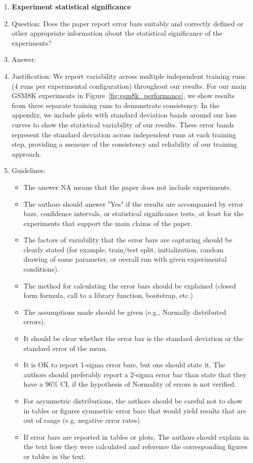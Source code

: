 \documentclass{article}
\begin{document}
\begin{enumerate}
\item {\bf Experiment statistical significance}
    \item[] Question: Does the paper report error bars suitably and correctly defined or other appropriate information about the statistical significance of the experiments?
    \item[] Answer: \answerYes{} %
    \item[] Justification: We report variability across multiple independent training runs (4 runs per experimental configuration) throughout our results. For our main GSM8K experiments in Figure~\ref{fig:gsm8k_performance}, we show results from three separate training runs to demonstrate consistency. In the appendix, we include plots with standard deviation bands around our loss curves to show the statistical variability of our results. These error bands represent the standard deviation across independent runs at each training step, providing a measure of the consistency and reliability of our training approach.
    \item[] Guidelines:
    \begin{itemize}
        \item The answer NA means that the paper does not include experiments.
        \item The authors should answer "Yes" if the results are accompanied by error bars, confidence intervals, or statistical significance tests, at least for the experiments that support the main claims of the paper.
        \item The factors of variability that the error bars are capturing should be clearly stated (for example, train/test split, initialization, random drawing of some parameter, or overall run with given experimental conditions).
        \item The method for calculating the error bars should be explained (closed form formula, call to a library function, bootstrap, etc.)
        \item The assumptions made should be given (e.g., Normally distributed errors).
        \item It should be clear whether the error bar is the standard deviation or the standard error of the mean.
        \item It is OK to report 1-sigma error bars, but one should state it. The authors should preferably report a 2-sigma error bar than state that they have a 96\% CI, if the hypothesis of Normality of errors is not verified.
        \item For asymmetric distributions, the authors should be careful not to show in tables or figures symmetric error bars that would yield results that are out of range (e.g. negative error rates).
        \item If error bars are reported in tables or plots, The authors should explain in the text how they were calculated and reference the corresponding figures or tables in the text.
    \end{itemize}


\end{enumerate}
\end{document}
